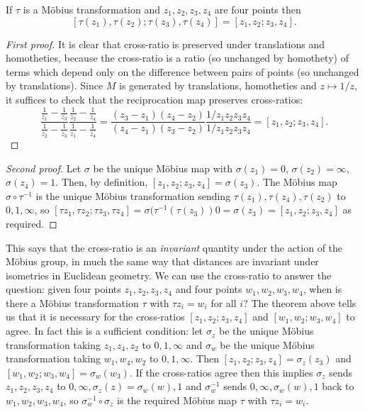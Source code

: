 \documentclass[12pt]{article}
\begin{document}
\begin{thm}
  If $\tau$ is a M\"obius transformation and $z_1,z_2,z_3,z_4$ are four points then
  \[[\tau(z_1),\tau(z_2);\tau(z_3),\tau(z_4)]=[z_1,z_2;z_3,z_4].\]
\end{thm}
\begin{proof}[First proof]
  It is clear that cross-ratio is preserved under translations and homotheties, because the cross-ratio is a ratio (so unchanged by homothety) of terms which depend only on the difference between pairs of points (so unchanged by translations). Since $M$ is generated by translations, homotheties and $z\mapsto 1/z$, it suffices to check that the reciprocation map preserves cross-ratios:
  \[\frac{\frac{1}{z_1}-\frac{1}{z_3}}{\frac{1}{z_2}-\frac{1}{z_3}}\frac{\frac{1}{z_2}-\frac{1}{z_4}}{\frac{1}{z_1}-\frac{1}{z_4}}=\frac{(z_3-z_1)(z_4-z_2)}{(z_4-z_1)(z_3-z_2)}\frac{1/z_1z_2z_3z_4}{1/z_1z_2z_3z_4}=[z_1,z_2;z_3,z_4].\]
\end{proof}
\begin{proof}[Second proof]
  Let $\sigma$ be the unique M\"obius map with $\sigma(z_1)=0$, $\sigma(z_2)=\infty$, $\sigma(z_4)=1$. Then, by definition, $[z_1,z_2;z_3,z_4]=\sigma(z_3)$. The M\"obius map $\sigma\circ\tau^{-1}$ is the unique M\"obius transformation sending $\tau(z_1),\tau(z_4),\tau(z_2)$ to $0,1,\infty$, so $[\tau z_1,\tau z_2;\tau z_3,\tau z_4]=\sigma(\tau^{-1}(\tau(z_3))0=\sigma(z_3)=[z_1,z_2;z_3,z_4]$ as required.
\end{proof}

This says that the cross-ratio is an {\em invariant} quantity under the action of the M\"obius group, in much the same way that distances are invariant under isometries in Euclidean geometry. We can use the cross-ratio to answer the question: given four points $z_1,z_2,z_3,z_4$ and four points $w_1,w_2,w_3,w_4$, when is there a M\"obius transformation $\tau$ with $\tau z_i=w_i$ for all $i$? The theorem above tells us that it is necessary for the cross-ratios $[z_1,z_2;z_3,z_4]$ and $[w_1,w_2;w_3,w_4]$ to agree. In fact this is a sufficient condition: let $\sigma_z$ be the unique M\"obius transformation taking $z_1,z_4,z_2$ to $0,1,\infty$ and $\sigma_w$ be the unique M\"obius transformation taking $w_1,w_4,w_2$ to $0,1,\infty$. Then $[z_1,z_2;z_3,z_4]=\sigma_z(z_3)$ and $[w_1,w_2;w_3,w_4]=\sigma_w(w_3)$. If the cross-ratios agree then this implies $\sigma_z$ sends $z_1,z_2,z_3,z_4$ to $0,\infty,\sigma_z(z)=\sigma_w(w),1$ and $\sigma_w^{-1}$ sends $0,\infty,\sigma_w(w),1$ back to $w_1,w_2,w_3,w_4$, so $\sigma_w^{-1}\circ\sigma_z$ is the required M\"obius map $\tau$ with $\tau z_i= w_i$.
\end{document}
